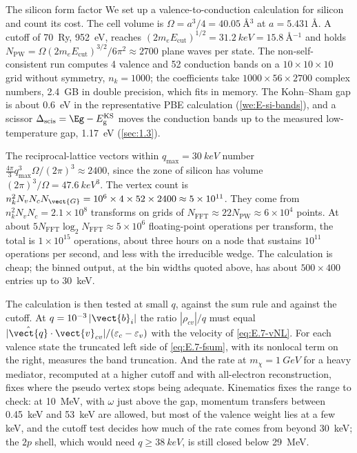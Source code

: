 \begin{workedexample}{The silicon form factor}\label{we:E-siff}
We set up a valence-to-conduction calculation for silicon and count its cost. The cell volume is $\Omega = a^3/4 = \SI{40.05}{\angstrom^3}$ at $a = \SI{5.431}{\angstrom}$. A cutoff of \SI{70}{Ry}, \SI{952}{eV}, reaches $(2m_eE_{\mathrm{cut}})^{1/2} = \SI{31.2}{keV} = \SI{15.8}{\angstrom^{-1}}$ and holds $N_{\mathrm{PW}} = \Omega(2m_eE_{\mathrm{cut}})^{3/2}/6\pi^2 \approx 2700$ plane waves per state. The non-self-consistent run computes 4 valence and 52 conduction bands on a $10\times10\times10$ grid without symmetry, $n_k = 1000$; the coefficients take $1000\times56\times2700$ complex numbers, \SI{2.4}{GB} in double precision, which fits in memory. The Kohn--Sham gap is about \SI{0.6}{eV} in the representative PBE calculation (\cref{we:E-si-bands}), and a scissor $\Delta_{\mathrm{scis}} = \Eg - E_{\mathrm{g}}^{\mathrm{KS}}$ moves the conduction bands up to the measured low-temperature gap, \SI{1.17}{eV} (\cref{sec:1.3}).

The reciprocal-lattice vectors within $q_{\mathrm{max}} = \SI{30}{keV}$ number $\frac{4\pi}{3}q_{\mathrm{max}}^3\Omega/(2\pi)^3 \approx 2400$, since the zone of silicon has volume $(2\pi)^3/\Omega = \SI{47.6}{keV^3}$. The vertex count is $n_k^2N_vN_cN_{\vect{G}} = 10^6\times4\times52\times2400 \approx 5\times10^{11}$. They come from $n_k^2N_vN_c = 2.1\times10^8$ transforms on grids of $N_{\mathrm{FFT}} \approx 22N_{\mathrm{PW}} \approx 6\times10^4$ points. At about $5N_{\mathrm{FFT}}\log_2N_{\mathrm{FFT}} \approx 5\times10^6$ floating-point operations per transform, the total is $1\times10^{15}$ operations, about three hours on a node that sustains $10^{11}$ operations per second, and less with the irreducible wedge. The calculation is cheap; the binned output, at the bin widths quoted above, has about $500\times400$ entries up to \SI{30}{keV}.

The calculation is then tested at small $q$, against the sum rule and against the cutoff. At $q = 10^{-3}\,|\vect{b}_i|$ the ratio $|\rho_{cv}|/q$ must equal $|\hat{\vect{q}}\cdot\vect{v}_{cv}|/(\varepsilon_c - \varepsilon_v)$ with the velocity of \cref{eq:E.7-vNL}. For each valence state the truncated left side of \cref{eq:E.7-fsum}, with its nonlocal term on the right, measures the band truncation. And the rate at $m_\chi = \SI{1}{GeV}$ for a heavy mediator, recomputed at a higher cutoff and with all-electron reconstruction, fixes where the pseudo vertex stops being adequate. Kinematics fixes the range to check: at \SI{10}{MeV}, with $\omega$ just above the gap, momentum transfers between \SI{0.45}{keV} and \SI{53}{keV} are allowed, but most of the valence weight lies at a few keV, and the cutoff test decides how much of the rate comes from beyond \SI{30}{keV}; the $2p$ shell, which would need $q \ge \SI{38}{keV}$, is still closed below \SI{29}{MeV}.
\end{workedexample}
